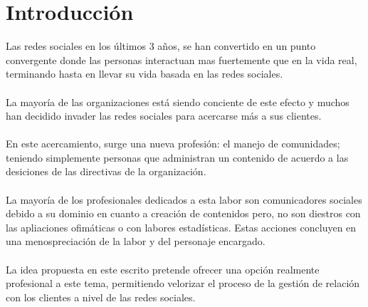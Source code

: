 \chapter*{Introducci\'on}
Las redes sociales en los \'ultimos 3 a\~nos, se han convertido en un punto convergente donde las personas interactuan mas fuertemente que en la vida real, terminando hasta en llevar su vida basada en las redes sociales.%
\\%
\\%
La mayor\'ia de las organizaciones est\'a siendo conciente de este efecto y muchos han decidido invader las redes sociales para acercarse m\'as a sus clientes.%
\\%
\\%
En este acercamiento, surge una nueva profesi\'on: el manejo de comunidades; teniendo simplemente personas que administran un contenido de acuerdo a las desiciones de las directivas de la organizaci\'on.%
\\%
\\%
La mayor\'ia de los profesionales dedicados a esta labor son comunicadores sociales debido a su dominio en cuanto a creaci\'on de contenidos pero, no son diestros con las apliaciones ofim\'aticas o con labores estad\'isticas. Estas acciones concluyen en una menospreciaci\'on de la labor y del personaje encargado.%
\\%
\\%
La idea propuesta en este escrito pretende ofrecer una opci\'on realmente profesional a este tema, permitiendo velorizar el proceso de la gesti\'on de relaci\'on con los clientes a nivel de las redes sociales.%